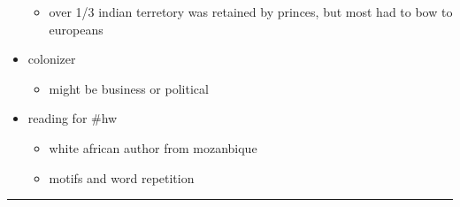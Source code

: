 \documentclass[letterpaper]{article}
\begin{document}
\begin{itemize}
\begin{itemize}
\item over 1/3 indian terretory was retained by princes, but most had to
bow to europeans
\end{itemize}

\item colonizer

\begin{itemize}
\item might be business or political
\end{itemize}

\item reading for \#hw

\begin{itemize}
\item white african author from mozanbique
\item motifs and word repetition
\end{itemize}
\end{itemize}

\noindent\rule{\textwidth}{0.5pt}
\end{document}
